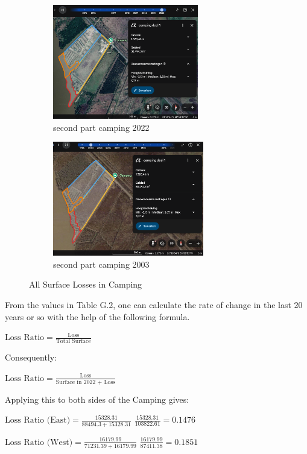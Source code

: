 \begin{figure}[H]
    \begin{subfigure}[b]{0.48\textwidth}
        \includegraphics[width=\linewidth, height =5cm]{figures/appendix-g/delen2022.png}
        \caption{second part camping 2022}
        \label{fig:second}
    \end{subfigure}
    \hfill
    \begin{subfigure}[b]{0.48\textwidth}
        \includegraphics[width=\linewidth, height =5cm]{figures/appendix-g/delen2003.png}
        \caption{second part camping 2003}
        \label{fig:second}
    \end{subfigure}

    \caption{All Surface Losses in Camping }
    \label{fig:All Surface Losses Camping}
\end{figure}

From the values in Table G.2, one can calculate the rate of change in the last 20 years or so with the help of the following formula.

$\text{Loss Ratio} = \frac{\text{Loss}}{\text{Total Surface}}$

Consequently:

$\text{Loss Ratio} = \frac{\text{Loss}}{\text{Surface in 2022 + Loss}}$

Applying this to both sides of the Camping gives:

$\text{Loss Ratio (East)} = \frac{15328.31}{88494.3 + 15328.31}$
$\frac{15328.31}{103822.61} = 0.1476$ 

$\text{Loss Ratio (West)} = \frac{16179.99}{71231.39 + 16179.99}$ 
$\frac{16179.99}{87411.38} = 0.1851 $ 

